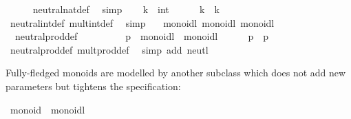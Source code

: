 \begin{isabellebody}
\ \ \ \ \isamarkupfalse%
\ neutral{\isacharunderscore}nat{\isacharunderscore}def\ \isamarkupfalse%
\ simp\isanewline
{}\isamarkupfalse%
\isanewline
\ \ \isamarkupfalse%
\ k\ {\isacharcolon}{\isacharcolon}\ int\isanewline
\ \ \isamarkupfalse%
\ {\isachardoublequoteopen}{\isasymone}\ {\isasymotimes}\ k\ {\isacharequal}\ k{\isachardoublequoteclose}\isanewline
\ \ \ \ \isamarkupfalse%
\ neutral{\isacharunderscore}int{\isacharunderscore}def\ mult{\isacharunderscore}int{\isacharunderscore}def\ \isamarkupfalse%
\ simp\isanewline
{}\isamarkupfalse%
\isanewline
\isanewline
{}\isamarkupfalse%
\isanewline
\isanewline
{}\isamarkupfalse%
\ {\isacharasterisk}\ {\isacharcolon}{\isacharcolon}\ {\isacharparenleft}monoidl{\isacharcomma}\ monoidl{\isacharparenright}\ monoidl\isanewline
{}\isanewline
\isanewline
{}\isamarkupfalse%
\isanewline
\ \ neutral{\isacharunderscore}prod{\isacharunderscore}def{\isacharcolon}\ {\isachardoublequoteopen}{\isasymone}\ {\isacharequal}\ {\isacharparenleft}{\isasymone}{\isacharcomma}\ {\isasymone}{\isacharparenright}{\isachardoublequoteclose}\isanewline
\isanewline
{}\isamarkupfalse%
\ \isamarkupfalse%
\isanewline
\ \ \isamarkupfalse%
\ p\ {\isacharcolon}{\isacharcolon}\ {\isachardoublequoteopen}{\isasymalpha}{\isasymColon}monoidl\ {\isasymtimes}\ {\isasymbeta}{\isasymColon}monoidl{\isachardoublequoteclose}\isanewline
\ \ \isamarkupfalse%
\ {\isachardoublequoteopen}{\isasymone}\ {\isasymotimes}\ p\ {\isacharequal}\ p{\isachardoublequoteclose}\isanewline
\ \ \ \ \isamarkupfalse%
\ neutral{\isacharunderscore}prod{\isacharunderscore}def\ mult{\isacharunderscore}prod{\isacharunderscore}def\ \isamarkupfalse%
\ {\isacharparenleft}simp\ add{\isacharcolon}\ neutl{\isacharparenright}\isanewline
{}\isamarkupfalse%
\isanewline
\isanewline
{}\isamarkupfalse%
%
\endisatagquote
{\isafoldquote}%
%
\isadelimquote
%
\endisadelimquote
%
\begin{isamarkuptext}%
\noindent Fully-fledged monoids are modelled by another subclass
  which does not add new parameters but tightens the specification:%
\end{isamarkuptext}%
\isamarkuptrue%
%
\isadelimquote
%
\endisadelimquote
%
\isatagquote
{}\isamarkupfalse%
\ monoid\ {\isacharequal}\ monoidl\ {\isacharplus}\isanewline

\end{isabellebody}
